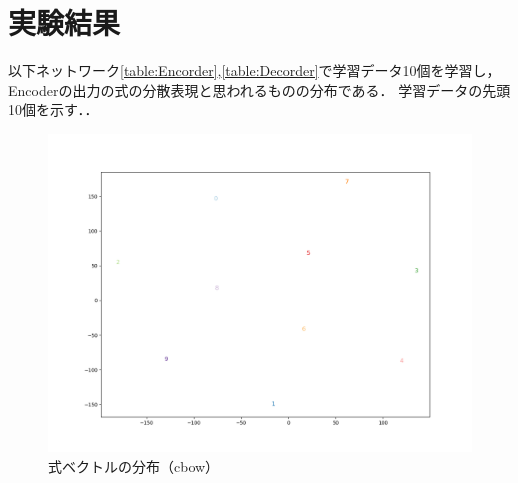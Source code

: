 \documentclass[a4j,11pt,report]{jsbook}
\begin{document}
\section{実験結果}
以下ネットワーク\ref{table:Encorder},\ref{table:Decorder}で学習データ10個を学習し，Encoderの出力の式の分散表現と思われるものの分布である．
学習データの先頭10個を示す．．


\begin{center}
  \begin{figure}
    \centering
    \includegraphics[width=0.8\linewidth]{image/cbow89x2.png}
    \caption{式ベクトルの分布（cbow）}
    \label{fig:formulavecter_fromCbow}
  \end{figure}
\end{center}
\end{document}
